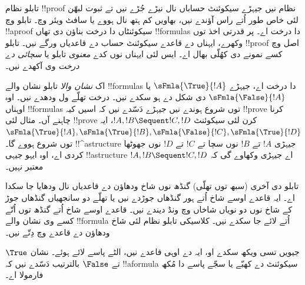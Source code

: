 \documentclass[../../../include/open-logic-section]{subfiles}
\begin{document}


تابلو نظام !!{proof} نظام نیں جیہڑے سیکوئنٹ حساباں نال نیڑے جُڑے نیں تے ثبوت لبھّن لئی خاص طور اُتے راس آؤندے نیں، بھاویں کم ہتھ نال ہووے یا سافٹ ویئر وچ۔ تابلو وچ !!a{proof} سیکوئنٹاں دا درخت بناؤن دی تھاں !!{formula}s دا درخت اے۔ پر قدرتی اخذ توں وکھرے، ایہناں دے قاعدے سیکوئنٹ حساب دے قاعدیاں ورگے نیں۔ تابلو !!{proof} اصل وچ کسے نمونے دی کھُلّی بھال اے۔ ایس لئی ایہناں نوں کدے \emph{معنوی} تابلو یا \emph{سچائی دے درخت} وی آکھدے نیں۔

اک \emph{نشان والا} تابلو نشان والے !!{formula}s دا درخت اے، جیہڑے $ \sFmla{\True}{!A}$ یا $ \sFmla{\False}{!A}$ دی شکل دے ہو سکدے نیں۔ درخت تھلّے ول ودھدے نیں۔ اوہ اوہناں !!{formula}s توں شروع ہوندے نیں جیہڑے دَسّدے نیں کہ اسیں کیہ !!{prove} کرنا چاہنے آں۔ مثال لئی !!{prove} کرن لئی سیکوئنٹ $!A, !B \Sequent !C, !D$، ایہ $ \sFmla{\True}{!A}, \sFmla{\True}{!B},
\sFmla{\False}{!C}, \sFmla{\True}{!D}$ توں شروع ہووے گا۔ !!^a{structure} جیہڑی $!A$ تے $!B$ نوں سچا تے $!C$ تے $!D$ نوں جھوٹھا کردی اے، اوہ ایہو جیہی !!a{structure} اے جیہڑی وکھاوے گی کہ $!A, !B \Sequent !C, !D$ معتبر نہیں۔

تابلو دی آخری (سبھ توں تھلّی) گنڈھ نوں شاخ ودھاؤن دے قاعدیاں نال ودھایا جا سکدا اے۔ ایہ قاعدے اوسے شاخ اُتے ہور گنڈھاں جوڑدے نیں یا تھلّے دو سانجھیاں گنڈھاں جوڑ کے شاخ نوں دو نویاں شاخاں وچ ونڈ دیندے نیں۔ قاعدے اوسے شاخ اُتے گنڈھ توں اُتّے کسے وی نشان والے !!{formula} اُتے لائے جا سکدے نیں۔ کلاسیکی تابلو نظام  لئی شاخ ودھاؤن دے قاعدے  وچ دِتّے نیں۔



جیویں تسی ویکھ سکدے او، ایہ  دے اوہی قاعدے نیں، الٹے پاسے لائے ہوئے۔ نشان $ \True$ تے $ \False$ بالترتیب دَسّدے نیں کہ !!a{formula} سیکوئنٹ دے کھبّے یا سجّے پاسے دا مُکھ فارمولا اے۔
\end{document}
